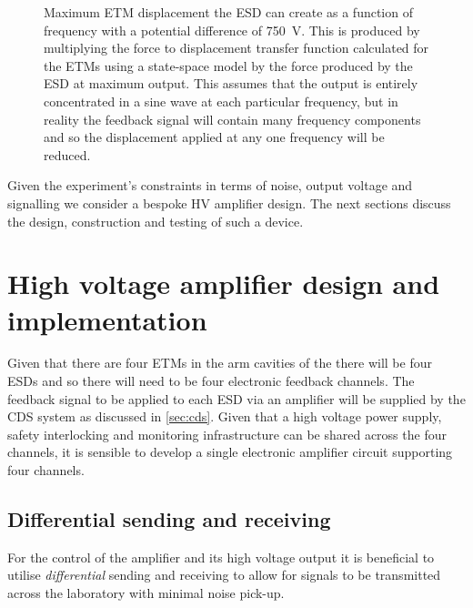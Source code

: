 \begin{figure}[htp]
  \centering
  
  \caption[Maximum end test mass displacement the electrostatic drive can create]{\label{fig:ssm-etm-disp-esd-max}Maximum \gls{ETM} displacement the \gls{ESD} can create as a function of frequency with a potential difference of \SI{750}{\volt}. This is produced by multiplying the force to displacement transfer function calculated for the \glspl{ETM} using a state-space model by the force produced by the \gls{ESD} at maximum output. This assumes that the output is entirely concentrated in a sine wave at each particular frequency, but in reality the feedback signal will contain many frequency components and so the displacement applied at any one frequency will be reduced.}
\end{figure}

Given the experiment's constraints in terms of noise, output voltage and signalling we consider a bespoke \gls{HV} amplifier design. The next sections discuss the design, construction and testing of such a device.

\section{\label{sec:hv-amplifier}High voltage amplifier design and implementation}
Given that there are four \glspl{ETM} in the arm cavities of the \SSMEXPT{} there will be four \glspl{ESD} and so there will need to be four electronic feedback channels. The feedback signal to be applied to each \gls{ESD} via an amplifier will be supplied by the \gls{CDS} system as discussed in \cref{sec:cds}. Given that a high voltage power supply, safety interlocking and monitoring infrastructure can be shared across the four channels, it is sensible to develop a single electronic amplifier circuit supporting four channels.

\subsection{Differential sending and receiving}
For the control of the amplifier and its high voltage output it is beneficial to utilise \emph{differential} sending and receiving to allow for signals to be transmitted across the laboratory with minimal noise pick-up.

